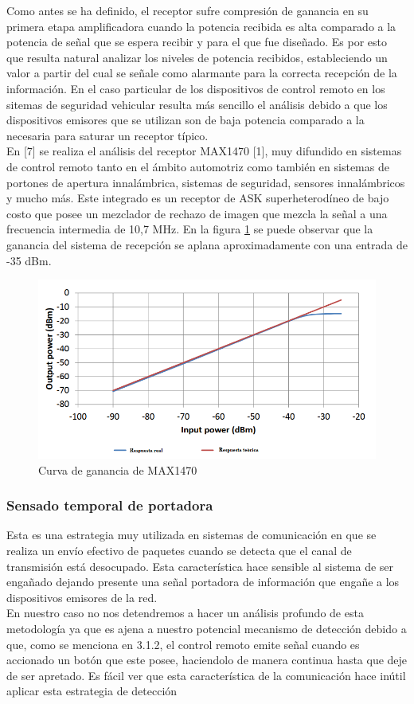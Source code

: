 \documentclass[12pt]{report}
\begin{document}
Como antes se ha definido, el receptor sufre compresión de ganancia en su primera etapa amplificadora cuando la potencia recibida es alta
comparado a la potencia de señal que se espera recibir y para el que fue diseñado. Es por esto que resulta natural analizar los niveles de
potencia recibidos, estableciendo un valor a partir del cual se señale como alarmante para la correcta recepción de la información. 
En el caso particular de los dispositivos de control remoto en los sitemas de seguridad vehicular resulta más sencillo el análisis 
debido a que los dispositivos emisores que se utilizan son de baja potencia comparado a la necesaria para saturar un receptor típico.\\
En [7] se realiza el análisis del receptor MAX1470 [1], muy difundido en sistemas de control remoto tanto en el ámbito automotriz como también
en sistemas de portones de apertura innalámbrica, sistemas de seguridad, sensores innalámbricos y mucho más. Este integrado es un receptor de 
ASK superheterodíneo de bajo costo que posee un mezclador de rechazo de imagen que mezcla la señal a una frecuencia intermedia de 10,7 MHz. En
la figura \ref{compresion_max} se puede observar que la ganancia del sistema de recepción se aplana aproximadamente con una entrada de -35 dBm.

\begin{figure}[htb]
	\centering
	\includegraphics[scale=0.5]{compresion_max.png}
    \caption{Curva de ganancia de MAX1470}
	\label{compresion_max}
\end{figure}


\subsubsection{Sensado temporal de portadora}

Esta es una estrategia muy utilizada en sistemas de comunicación en que se realiza un envío efectivo de paquetes cuando se detecta que el canal 
de transmisión está desocupado. Esta característica hace sensible al sistema de ser engañado dejando presente una señal portadora de información
que engañe a los dispositivos emisores de la red.\\
En nuestro caso no nos detendremos a hacer un análisis profundo de esta metodología ya que es ajena a nuestro potencial mecanismo de detección
debido a que, como se menciona en 3.1.2, el control remoto emite señal cuando es accionado un botón que este posee, haciendolo de manera continua
hasta que deje de ser apretado. Es fácil ver que esta característica de la comunicación hace inútil aplicar esta estrategia de detección
\end{document}
